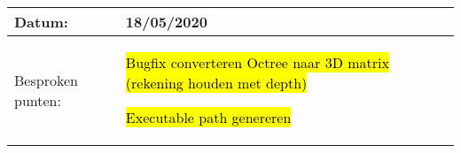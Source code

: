 \begin{tabularx}{\textwidth}{| l | X |}
  \hline
  Datum: & 18/05/2020\\
  \hline
  Besproken punten: &
  \begin{compactitem}
    \item \hl{Bugfix converteren Octree naar 3D matrix (rekening houden met depth)}
    \item \hl{Executable path genereren}
  \end{compactitem}\\
  \hline
\end{tabularx}